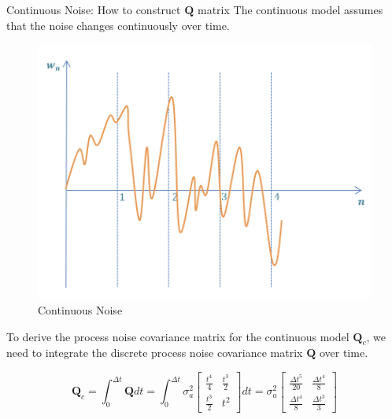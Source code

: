 \begin{frame}{Continuous Noise: How to construct  $\mathbf{Q}$ matrix }
The continuous model assumes that the noise changes continuously over time.
    \begin{figure}
        \centering
        \includegraphics[width=0.4\linewidth]{Figures//Chapter2/ContinuousNoise.png}
        \caption{Continuous Noise}
        \label{fig:ContinuousNoise}
    \end{figure}


To derive the process noise covariance matrix for the continuous model $\mathbf{Q}_c$, we need to integrate the discrete process noise covariance matrix $\mathbf{Q}$ over time.

\[
\mathbf{Q}_{c} = \int_{0}^{\Delta t} \mathbf{Q} dt = \int_{0}^{\Delta t} \sigma_a^2 
\begin{bmatrix}
\frac{t^4}{4} & \frac{t^3}{2} \\
\frac{t^3}{2} & t^2
\end{bmatrix}
dt = \sigma_a^2 
\begin{bmatrix}
\frac{\Delta t^5}{20} & \frac{\Delta t^4}{8} \\
\frac{\Delta t^4}{8} & \frac{\Delta t^3}{3}
\end{bmatrix}
\]
\end{frame}
